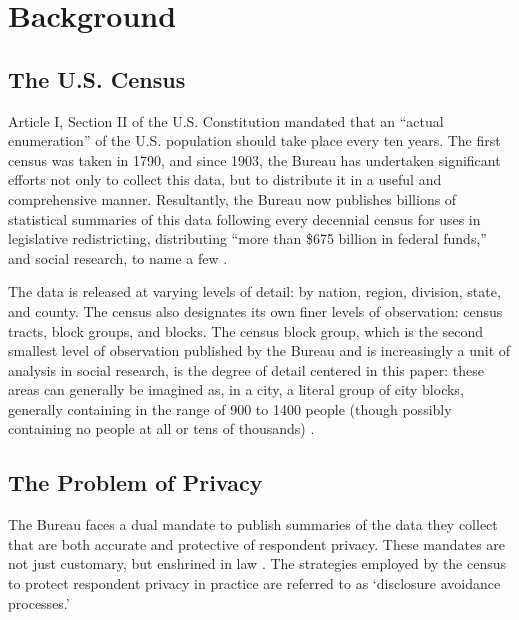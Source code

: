 \section{Background} \label{sec:background}


\subsection{The U.S. Census}\label{sec:census}

Article I, Section II of the U.S. Constitution mandated that an ``actual enumeration'' of the U.S. population should take place every ten years. The first census was taken in 1790, and since 1903, the Bureau has undertaken significant efforts not only to collect this data, but to distribute it in a useful and comprehensive manner. Resultantly, the Bureau now publishes billions of statistical summaries of this data following every decennial census for uses in legislative redistricting, distributing ``more than \$675 billion in federal funds,'' and social research, to name a few \cite{bureau_us_2020}.

The data is released at varying levels of detail: by nation, region, division, state, and county. The census also designates its own finer levels of observation: census tracts, block groups, and blocks. The census block group, which is the second smallest level of observation published by the Bureau and is increasingly a unit of analysis in social research, is the degree of detail centered in this paper: these areas can generally be imagined as, in a city, a literal group of city blocks, generally containing in the range of 900 to 1400 people (though possibly containing no people at all or tens of thousands) \cite{bureau_us_2020}.

\subsection{The Problem of Privacy}\label{sec:privacy}

The Bureau faces a dual mandate to publish summaries of the data they collect that are both accurate and protective of respondent privacy. These mandates are not just customary, but enshrined in law \cite{code_title_1954, code_title_2002}. The strategies employed by the census to protect respondent privacy in practice are referred to as `disclosure avoidance processes.'


